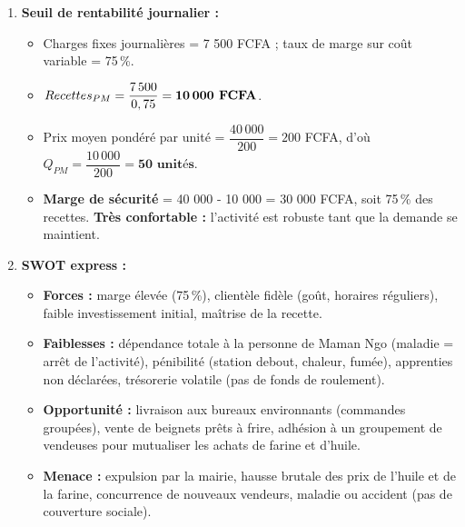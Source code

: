 \documentclass[11pt]{article}
\begin{document}
\begin{exoresolu}
\begin{enumerate}
\begin{align*}
                  \textbf{Total des charges fixes} &= \textbf{7\,500 FCFA} \\
                  \textbf{Revenu net avant épargne} &= 30\,000 - 7\,500 = \textbf{22\,500 FCFA} \\
                  \textbf{Épargne tontine} &= 2\,000 \\
                  \textbf{Revenu disponible du ménage} &= \textbf{20\,500 FCFA / jour}
              \end{align*}
              \emph{Interprétation :} environ 600 000 FCFA par mois, très supérieur au seuil de pauvreté : l'activité fait vivre correctement le ménage.
        \item \textbf{Seuil de rentabilité journalier :}
              \begin{itemize}
                  \item Charges fixes journalières = 7 500 FCFA ; taux de marge sur coût variable = 75\,\%.
                  \item $Recettes_{PM} = \dfrac{7\,500}{0,75} = \textbf{10\,000 FCFA}$.
                  \item Prix moyen pondéré par unité = $\dfrac{40\,000}{200} = 200$ FCFA, d'où $Q_{PM} = \dfrac{10\,000}{200} = \textbf{50 unités}$.
                  \item \textbf{Marge de sécurité} = 40 000 - 10 000 = 30 000 FCFA, soit 75\,\% des recettes. \textbf{Très confortable :} l'activité est robuste tant que la demande se maintient.
              \end{itemize}
        \item \textbf{SWOT express :}
              \begin{itemize}
                  \item \textbf{Forces :} marge élevée (75\,\%), clientèle fidèle (goût, horaires réguliers), faible investissement initial, maîtrise de la recette.
                  \item \textbf{Faiblesses :} dépendance totale à la personne de Maman Ngo (maladie = arrêt de l'activité), pénibilité (station debout, chaleur, fumée), apprenties non déclarées, trésorerie volatile (pas de fonds de roulement).
                  \item \textbf{Opportunité :} livraison aux bureaux environnants (commandes groupées), vente de beignets prêts à frire, adhésion à un groupement de vendeuses pour mutualiser les achats de farine et d'huile.
                  \item \textbf{Menace :} expulsion par la mairie, hausse brutale des prix de l'huile et de la farine, concurrence de nouveaux vendeurs, maladie ou accident (pas de couverture sociale).

\end{itemize}
\end{enumerate}
\end{exoresolu}
\end{document}
